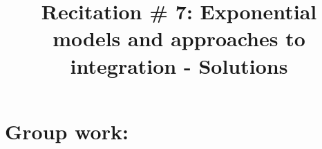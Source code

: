 \documentclass[noinstructornotes]{ximera}
\title{Recitation \# 7: Exponential models and approaches to integration - Solutions}
\begin{document}
\begin{abstract}		\end{abstract}
\maketitle

\section{Group work:}
\end{document}

